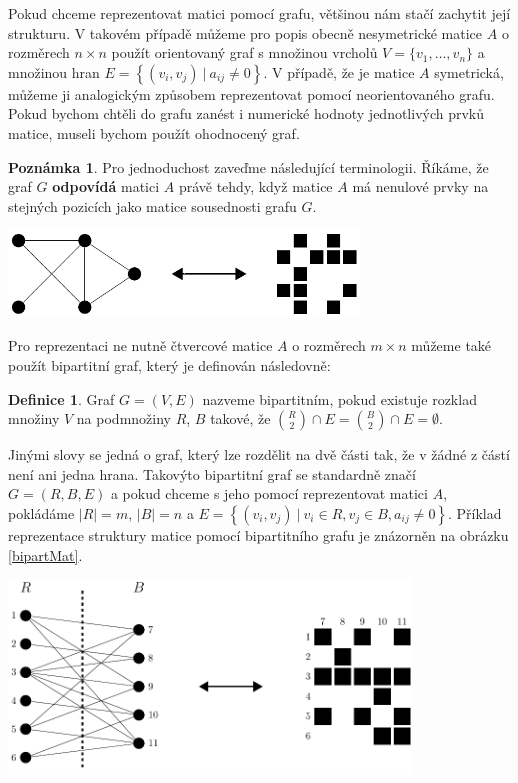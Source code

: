 \documentclass{ctuthesis}
\theoremstyle{plain}
\theoremstyle{definition}
\newtheorem{definition}{Definice}
\newtheorem{remark}{Poznámka}
\begin{document}
\medskip

Pokud chceme reprezentovat matici pomocí grafu, většinou nám stačí zachytit její strukturu. V takovém případě můžeme pro popis obecně nesymetrické matice $A$ o rozměrech $n \times n$ použít orientovaný graf s množinou vrcholů $V = \{v_1,\ldots,v_n\}$ a množinou hran $E =\left\{(v_i,v_j) \ | \ a_{ij}\neq 0\right\}$. V případě, že je matice $A$ symetrická, můžeme ji analogickým způsobem reprezentovat pomocí neorientovaného grafu.
Pokud bychom chtěli do grafu zanést i numerické hodnoty jednotlivých prvků matice, museli bychom použít ohodnocený graf.

\begin{remark}
  Pro jednoduchost zaveďme následující terminologii. Říkáme, že graf $G$ \textbf{odpovídá} matici $A$ právě tehdy, když matice $A$ má nenulové prvky na stejných pozicích jako matice sousednosti grafu $G$.
\end{remark}

\bigskip
{
  \centering
  \includegraphics[width=0.7\textwidth]{pictures/matgr.pdf}
}
\bigskip

Pro reprezentaci ne nutně čtvercové matice $A$ o rozměrech $m\times n$ můžeme také použít bipartitní graf, který je definován následovně:

\begin{definition}
  Graf $G=(V,E)$ nazveme bipartitním, pokud existuje rozklad množiny $V$ na podmnožiny $R$, $B$ takové, že ${R \choose 2} \cap E = {B \choose 2} \cap E = \emptyset$.
\end{definition}

Jinými slovy se jedná o graf, který lze rozdělit na dvě části tak, že v žádné z částí není ani jedna hrana. Takovýto bipartitní graf se standardně značí $G=(R,B,E)$ a pokud chceme s jeho pomocí reprezentovat matici $A$, pokládáme $|R|=m$, $|B|=n$ a $E = \left\{(v_i,v_j) \ | \ v_i \in R, v_j \in B, a_{ij} \neq 0 \right\}$. Příklad reprezentace struktury matice pomocí bipartitního grafu je znázorněn na obrázku \ref{bipartMat}.

\bigskip
{
  \centering
  \includegraphics[width=0.8\textwidth]{pictures/bipart_grmat.pdf}
}
\end{document}
